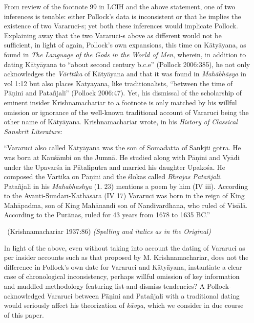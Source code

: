 From review of the footnote 99 in LCIH and the above statement, one of two inferences is tenable: either Pollock’s data is inconsistent or that he implies the existence of two Vararuci-s; yet both these inferences would implicate Pollock. Explaining away that the two Vararuci-s above as different would not be sufficient, in light of again, Pollock’s own expansions, this time on Kātyāyana, as found in \textit{The Language of the Gods in the World of Men}, wherein, in addition to dating Kātyāyana to “about second century b.c.e” (Pollock 2006:385), he not only acknowledges the \textit{Vārttika} of Kātyāyana and that it was found in \textit{Mahābhāṣya} in vol 1:12 but also places Kātyāyana, like traditionalists, “between the time of Pāṇini and Patañjali” (Pollock 2006:47). Yet, his dismissal of the scholarship of eminent insider Krishnamachariar to a footnote is only matched by his willful omission or ignorance of the well-known traditional account of Vararuci being the other name of Kātyāyana. Krishnamachariar wrote, in his \textit{History of Classical Sanskrit Literature}:

\begin{myquote}
“Vararuci also called Kātyāyana was the son of Somadatta of Sankjti gotra. He was born at Kauśāmbi on the Jumnā. He studied along with Pāṇini and Vyādi under the Upavarśa in Pātaliputra and married his daughter Upakośa. He composed the Vārtika on Pāṇini and the ślokas called \textit{Bhrajas Patañjali}. Patañjali in his \textit{Mahabhashya} (1. 23) mentions a poem by him (IV iii). According to the Avanti-Sundarī-Kathāsāra (IV 17) Vararuci was born in the reign of King Mahāpadma, son of King Mahānandi son of Nandivardhana, who ruled of Visālā. According to the Purānas, ruled for 43 years from 1678 to 1635 BC.” 

~\hfill (Krishnamachariar 1937:86) \textit{(Spelling and italics as in the Original)}
\end{myquote}

In light of the above, even without taking into account the dating of Vararuci as per insider accounts such as that proposed by M. Krishnamachariar, does not the difference in Pollock’s own date for Vararuci and Kātyāyana, instantiate a clear case of chronological inconsistency, perhaps willful omission of key information and muddled methodology featuring list-and-dismiss tendencies? A Pollock-acknowledged Vararuci between Pāṇini and Patañjali with a traditional dating would seriously affect his theorization of \textit{kāvya}, which we consider in due course of this paper.


